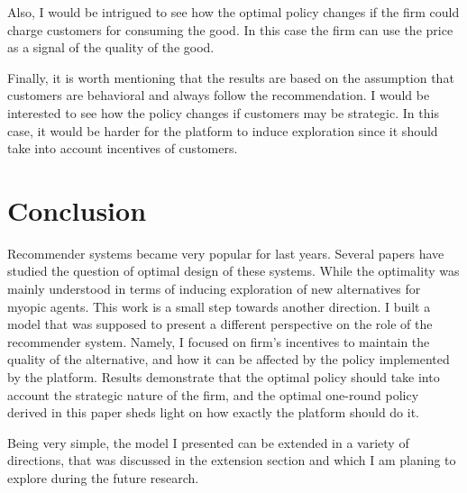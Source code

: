 \documentclass[a4paper]{article}
\begin{document}
Also, I would be intrigued to see how the optimal policy changes if the firm could charge customers for consuming the good. In this case the firm can use the price as a signal of the quality of the good. 




Finally, it is worth mentioning that the results are based on the assumption that customers are behavioral and always follow the recommendation. I would be interested to see how the policy changes if customers may be strategic. In this case, it would be harder for the platform to induce exploration since it should take into account incentives of customers. 
\section{Conclusion}
Recommender systems became very popular for last years. Several papers have studied the question of optimal design of these systems. While the optimality was mainly understood in terms of inducing exploration of new alternatives for myopic agents. This work is a small step towards another direction. I built a model that was supposed to present a different perspective on the role of the recommender system. Namely, I focused on firm's incentives to maintain the quality of the alternative, and how it can be affected by the policy implemented by the platform. Results demonstrate that the optimal policy should take into account the strategic nature of the firm, and the optimal one-round policy derived in this paper sheds light on how exactly the platform should do it. 


Being very simple, the model I presented can be extended in a variety of directions, that was discussed in the extension section and which I am planing to explore during the future research.


 
{}

\end{document}
